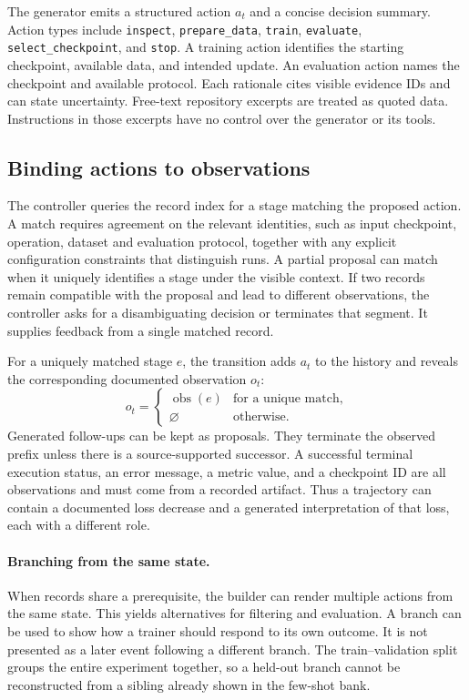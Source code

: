 \documentclass{article}
\newcommand{\field}[1]{\texttt{#1}}
\begin{document}
The generator emits a structured action \(a_t\) and a concise decision summary. Action types include \field{inspect}, \field{prepare\_data}, \field{train}, \field{evaluate}, \field{select\_checkpoint}, and \field{stop}. A training action identifies the starting checkpoint, available data, and intended update. An evaluation action names the checkpoint and available protocol. Each rationale cites visible evidence IDs and can state uncertainty. Free-text repository excerpts are treated as quoted data. Instructions in those excerpts have no control over the generator or its tools.

\subsection{Binding actions to observations}

The controller queries the record index for a stage matching the proposed action. A match requires agreement on the relevant identities, such as input checkpoint, operation, dataset and evaluation protocol, together with any explicit configuration constraints that distinguish runs. A partial proposal can match when it uniquely identifies a stage under the visible context. If two records remain compatible with the proposal and lead to different observations, the controller asks for a disambiguating decision or terminates that segment. It supplies feedback from a single matched record.

For a uniquely matched stage \(e\), the transition adds \(a_t\) to the history and reveals the corresponding documented observation \(o_t\):
\begin{equation}
o_t =
\begin{cases}
\operatorname{obs}(e) & \text{for a unique match},\\
\varnothing & \text{otherwise}.
\end{cases}
\label{eq:outcome}
\end{equation}
Generated follow-ups can be kept as proposals. They terminate the observed prefix unless there is a source-supported successor. A successful terminal execution status, an error message, a metric value, and a checkpoint ID are all observations and must come from a recorded artifact. Thus a trajectory can contain a documented loss decrease and a generated interpretation of that loss, each with a different role.

\paragraph{Branching from the same state.}
When records share a prerequisite, the builder can render multiple actions from the same state. This yields alternatives for filtering and evaluation. A branch can be used to show how a trainer should respond to its own outcome. It is not presented as a later event following a different branch. The train--validation split groups the entire experiment together, so a held-out branch cannot be reconstructed from a sibling already shown in the few-shot bank.
\end{document}
